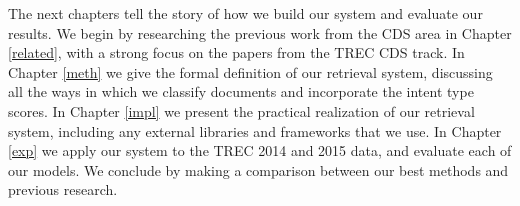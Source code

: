The next chapters tell the story of how we build our system and evaluate our results. 
We begin by researching the previous work from the CDS area in Chapter \ref{related},
with a strong focus on the papers from the TREC CDS track. 
In Chapter \ref{meth} we give the formal definition of our retrieval system, discussing all the ways in which we classify documents
and incorporate the intent type scores. 
In Chapter \ref{impl} we present the practical realization of our retrieval system, including any external libraries
and frameworks that we use.
In Chapter \ref{exp} we apply our system to the TREC 2014 and 2015 data, and evaluate each of our models.
We conclude by making a comparison between our best methods and previous research.







